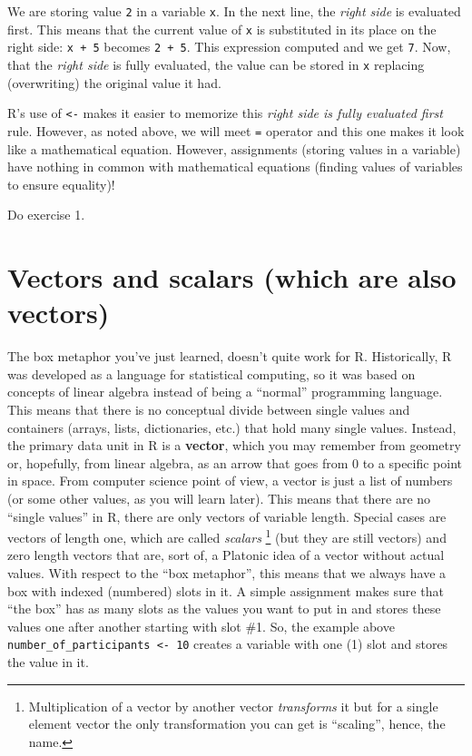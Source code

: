 \documentclass[
]{book}
\begin{document}
We are storing value \texttt{2} in a variable \texttt{x}. In the next line, the \emph{right side} is evaluated first. This means that the current value of \texttt{x} is substituted in its place on the right side: \texttt{x\ +\ 5} becomes \texttt{2\ +\ 5}. This expression computed and we get \texttt{7}. Now, that the \emph{right side} is fully evaluated, the value can be stored in \texttt{x} replacing (overwriting) the original value it had.

R's use of \texttt{\textless{}-} makes it easier to memorize this \emph{right side is fully evaluated first} rule. However, as noted above, we will meet \texttt{=} operator and this one makes it look like a mathematical equation. However, assignments (storing values in a variable) have nothing in common with mathematical equations (finding values of variables to ensure equality)!

Do exercise 1.

\hypertarget{vectors-scalars}{%
\section{Vectors and scalars (which are also vectors)}\label{vectors-scalars}}

The box metaphor you've just learned, doesn't quite work for R. Historically, R was developed as a language for statistical computing, so it was based on concepts of linear algebra instead of being a ``normal'' programming language. This means that there is no conceptual divide between single values and containers (arrays, lists, dictionaries, etc.) that hold many single values. Instead, the primary data unit in R is a \textbf{vector}, which you may remember from geometry or, hopefully, from linear algebra, as an arrow that goes from 0 to a specific point in space. From computer science point of view, a vector is just a list of numbers (or some other values, as you will learn later). This means that there are no ``single values'' in R, there are only vectors of variable length. Special cases are vectors of length one, which are called \emph{scalars} \footnote{Multiplication of a vector by another vector \emph{transforms} it but for a single element vector the only transformation you can get is ``scaling'', hence, the name.} (but they are still vectors) and zero length vectors that are, sort of, a Platonic idea of a vector without actual values. With respect to the ``box metaphor'', this means that we always have a box with indexed (numbered) slots in it. A simple assignment makes sure that ``the box'' has as many slots as the values you want to put in and stores these values one after another starting with slot \#1. So, the example above \texttt{number\_of\_participants\ \textless{}-\ 10} creates a variable with one (1) slot and stores the value in it.
\end{document}

